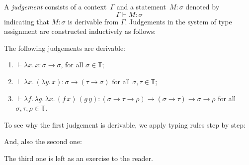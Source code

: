 \begin{definition}
  A \emph{judgement} consists of a context~$\Gamma$ and a statement~$M:\sigma$ denoted by
      \[
        \Gamma \vdash M : \sigma
      \]
  indicating that $M : \sigma$ is derivable from $\Gamma$. Judgements in the
  system of type assignment are constructed inductively as follows:
  \begin{multicols}{2} 
  \begin{prooftree}
  \end{prooftree}
  \begin{prooftree}
  \end{prooftree}
  \begin{prooftree}
  \end{prooftree}
  \end{multicols}
\end{definition}

\begin{example}
  The following judgements are derivable:
  \begin{enumerate}
    \item $\vdash \lambda x.\, x : \sigma \to \sigma$, for all $\sigma \in
      \mathbb{T}$;
    \item $ \vdash \lambda x.\, (\lambda y.\, x) : \sigma \to (\tau \to \sigma)$
      for all $\sigma, \tau\in\mathbb{T}$;
    \item $\vdash \lambda f.\,\lambda g.\, \lambda x.\, (f\,x)\, (g\,y) 
      : (\sigma \to \tau \to \rho) \to (\sigma\to\tau) \to \sigma\to\rho$
      for all $\sigma, \tau, \rho \in \mathbb{T}$.
  \end{enumerate}
\end{example}
To see why the first judgement is derivable, we apply typing rules
step by step:
\begin{prooftree}
\end{prooftree}
And, also the second one:
\begin{prooftree}
\end{prooftree}
The third one is left as an exercise to the reader.

